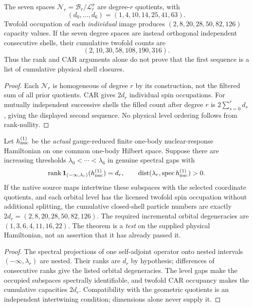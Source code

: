 \documentclass[12pt,a4paper]{article}
\begin{document}
\begin{proposition}
\label{p11:prop:v350-nuclear-cumulative-obstruction}
The seven spaces $\mathcal N_r=\mathcal B_r/\mathcal L_r^\sigma$
are degree-$r$ quotients, with
\[
 (d_0,\ldots,d_6)=(1,4,10,14,25,41,63).
\]
Twofold occupation of each \emph{individual} image produces
$(2,8,20,28,50,82,126)$ capacity values. If the seven degree
spaces are instead orthogonal independent consecutive shells,
their cumulative twofold counts are
\[
 \boxed{(2,10,30,58,108,190,316).}
\]
Thus the rank and CAR arguments alone do not prove that the first
sequence is a list of cumulative physical shell closures.
\end{proposition}
\begin{proof}
Each $\mathcal N_r$ is homogeneous of degree $r$ by its
construction, not the filtered sum of all prior quotients.
CAR gives $2d_r$ individual spin occupations. For mutually
independent successive shells the filled count after degree $r$
is $2\sum_{s=0}^rd_s$, giving the displayed second sequence.
No physical level ordering follows from rank-nullity.
\end{proof}

\begin{theorem}
\label{p11:thm:v350-nuclear-physical-spectral-count}
Let $h^{(1)}_{\rm nuc}$ be the \emph{actual} gauge-reduced finite
one-body nuclear-response Hamiltonian on one common one-body
Hilbert space. Suppose there are increasing thresholds
$\lambda_0<\cdots<\lambda_6$ in genuine spectral gaps with
\begin{equation}
\label{p11:eq:v350-nuclear-spectral-count}
 \operatorname{rank}\mathbf1_{(-\infty,\lambda_r)}(h^{(1)}_{\rm nuc})
 =d_r,\qquad
 \operatorname{dist}(\lambda_r,\operatorname{spec}h^{(1)}_{\rm nuc})>0.
\end{equation}
If the native source maps intertwine these subspaces with the
selected coordinate quotients, and each orbital level has the
licensed twofold spin occupation without additional splitting,
the cumulative closed-shell particle numbers are exactly
$2d_r=(2,8,20,28,50,82,126)$.
The required incremental orbital degeneracies are
$(1,3,6,4,11,16,22)$. The theorem is a \emph{test} on the supplied
physical Hamiltonian, not an assertion that it has already passed it.
\end{theorem}
\begin{proof}
The spectral projections of one self-adjoint operator onto
nested intervals $(-\infty,\lambda_r)$ are nested. Their
ranks are $d_r$ by hypothesis; differences of consecutive
ranks give the listed orbital degeneracies. The level gaps
make the occupied subspaces spectrally identifiable, and
twofold CAR occupancy makes the cumulative capacities $2d_r$.
Compatibility with the geometric quotients is an independent
intertwining condition; dimensions alone never supply it.
\end{proof}
\end{document}
